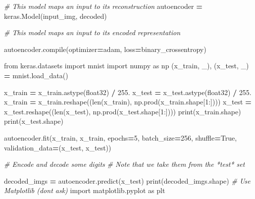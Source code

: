 \documentclass[
  a4paper,
  DIV=11,
  numbers=noendperiod]{scrreprt}
\newenvironment{Shaded}{\begin{snugshade}}{\end{snugshade}}
\newcommand{\BuiltInTok}[1]{#1}
\newcommand{\CommentTok}[1]{\textcolor[rgb]{0.56,0.35,0.01}{\textit{#1}}}
\newcommand{\DecValTok}[1]{\textcolor[rgb]{0.00,0.00,0.81}{#1}}
\newcommand{\FloatTok}[1]{\textcolor[rgb]{0.00,0.00,0.81}{#1}}
\newcommand{\ImportTok}[1]{#1}
\newcommand{\NormalTok}[1]{#1}
\newcommand{\OperatorTok}[1]{\textcolor[rgb]{0.81,0.36,0.00}{\textbf{#1}}}
\newcommand{\StringTok}[1]{\textcolor[rgb]{0.31,0.60,0.02}{#1}}
\newcommand{\VariableTok}[1]{\textcolor[rgb]{0.00,0.00,0.00}{#1}}
\begin{document}
\begin{Shaded}
\begin{Highlighting}[numbers=left,,]
\CommentTok{\# This model maps an input to its reconstruction}
\NormalTok{autoencoder }\OperatorTok{=}\NormalTok{ keras.Model(input\_img, decoded)}

\CommentTok{\# This model maps an input to its encoded representation}

\NormalTok{autoencoder.}\BuiltInTok{compile}\NormalTok{(optimizer}\OperatorTok{=}\StringTok{\textquotesingle{}adam\textquotesingle{}}\NormalTok{, loss}\OperatorTok{=}\StringTok{\textquotesingle{}binary\_crossentropy\textquotesingle{}}\NormalTok{)}

\ImportTok{from}\NormalTok{ keras.datasets }\ImportTok{import}\NormalTok{ mnist}
\ImportTok{import}\NormalTok{ numpy }\ImportTok{as}\NormalTok{ np}
\NormalTok{(x\_train, \_), (x\_test, \_) }\OperatorTok{=}\NormalTok{ mnist.load\_data()}

\NormalTok{x\_train }\OperatorTok{=}\NormalTok{ x\_train.astype(}\StringTok{\textquotesingle{}float32\textquotesingle{}}\NormalTok{) }\OperatorTok{/} \FloatTok{255.}
\NormalTok{x\_test }\OperatorTok{=}\NormalTok{ x\_test.astype(}\StringTok{\textquotesingle{}float32\textquotesingle{}}\NormalTok{) }\OperatorTok{/} \FloatTok{255.}
\NormalTok{x\_train }\OperatorTok{=}\NormalTok{ x\_train.reshape((}\BuiltInTok{len}\NormalTok{(x\_train), np.prod(x\_train.shape[}\DecValTok{1}\NormalTok{:])))}
\NormalTok{x\_test }\OperatorTok{=}\NormalTok{ x\_test.reshape((}\BuiltInTok{len}\NormalTok{(x\_test), np.prod(x\_test.shape[}\DecValTok{1}\NormalTok{:])))}
\BuiltInTok{print}\NormalTok{(x\_train.shape)}
\BuiltInTok{print}\NormalTok{(x\_test.shape)}

\NormalTok{autoencoder.fit(x\_train, x\_train,}
\NormalTok{                epochs}\OperatorTok{=}\DecValTok{5}\NormalTok{,}
\NormalTok{                batch\_size}\OperatorTok{=}\DecValTok{256}\NormalTok{,}
\NormalTok{                shuffle}\OperatorTok{=}\VariableTok{True}\NormalTok{,}
\NormalTok{                validation\_data}\OperatorTok{=}\NormalTok{(x\_test, x\_test))}

\CommentTok{\# Encode and decode some digits}
\CommentTok{\# Note that we take them from the *test* set}

\NormalTok{decoded\_imgs }\OperatorTok{=}\NormalTok{ autoencoder.predict(x\_test)}
\BuiltInTok{print}\NormalTok{(decoded\_imgs.shape)}
\CommentTok{\# Use Matplotlib (don\textquotesingle{}t ask)}
\ImportTok{import}\NormalTok{ matplotlib.pyplot }\ImportTok{as}\NormalTok{ plt}


\end{Highlighting}
\end{Shaded}
\end{document}
